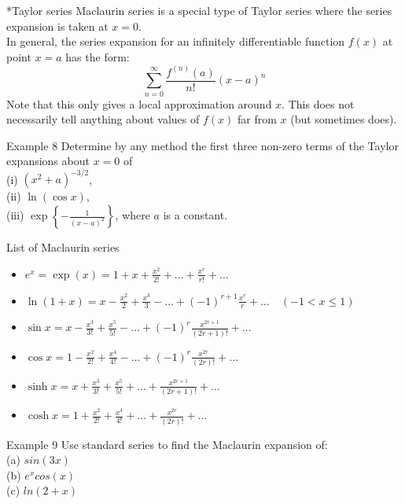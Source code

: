 \documentclass{beamer}
\begin{document}
\begin{frame}{*Taylor series}
    Maclaurin series is a special type of Taylor series where the series expansion is taken at $x=0$.\\
    In general, the series expansion for an infinitely differentiable function $f(x)$ at point $x=a$ has the form:
    $$\sum_{n=0}^{\infty} \frac{f^{(n)}(a)}{n !}(x-a)^n$$
    Note that this only gives a local approximation around $x$. This does not necessarily tell anything about values of $f(x)$ far from $x$ (but sometimes does).
\end{frame}

\begin{frame}{Example 8}
Determine by any method the first three non-zero terms of the Taylor expansions about $x=0$ of\\
(i) $\left(x^2+a\right)^{-3 / 2}$,\\
(ii) $\ln (\cos x)$,\\
(iii) $\exp \left\{-\frac{1}{(x-a)^2}\right\}$, where $a$ is a constant.
\end{frame}

\begin{frame}{List of Maclaurin series}
    \begin{itemize}
        \item $e^x=\exp (x)=1+x+\frac{x^2}{2 !}+\ldots+\frac{x^r}{r !}+\ldots $
        \item $\ln (1+x)=x-\frac{x^2}{2}+\frac{x^3}{3}-\ldots+(-1)^{r+1} \frac{x^r}{r}+\ldots \quad (-1<x \leqslant 1)$
        \item $\sin x=x-\frac{x^3}{3 !}+\frac{x^5}{5 !}-\ldots+(-1)^r \frac{x^{2 r+1}}{(2 r+1) !}+\ldots$
        \item $\cos x=1-\frac{x^2}{2 !}+\frac{x^4}{4 !}-\ldots+(-1)^r \frac{x^{2 r}}{(2 r) !}+\ldots$
        \item $\sinh x=x+\frac{x^3}{3 !}+\frac{x^5}{5 !}+\ldots+\frac{x^{2 r+1}}{(2 r+1) !}+\ldots$
        \item $\cosh x=1+\frac{x^2}{2 !}+\frac{x^4}{4 !}+\ldots+\frac{x^{2 r}}{(2 r) !}+\ldots$
    \end{itemize}
\end{frame}

\begin{frame}{Example 9}
Use standard series to find the Maclaurin expansion of:\\
(a) $sin(3x)$\\
(b) $e^xcos(x)$\\
(c) $ln(2+x)$
\end{frame}
\end{document}
